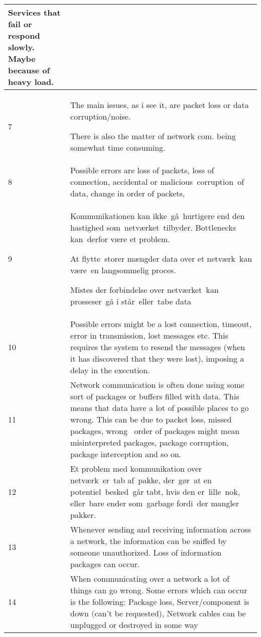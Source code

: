 \begin{longtable}{|p{0.3cm}|p{14.7cm}|}
\noindent Services that fail or respond slowly. Maybe because of heavy load. \\ \hline 

7 & The main issues, as i see it, are packet loss or data corruption/noise.

\noindent There is also the matter of network com. being somewhat time consuming. \\ \hline 

8 & Possible errors are loss of packets, loss of connection, accidental or malicious corruption of data, change in order of packets, \\ \hline 

9 & Kommunikationen kan ikke gå hurtigere end den hastighed som netværket tilbyder. Bottlenecks kan derfor være et problem.

\noindent At flytte storer mængder data over et netværk kan være en langsommelig proces.

\noindent Mistes der forbindelse over netværket kan prosseser gå i står eller tabe data \\ \hline 

10 & Possible errors might be a lost connection, timeout, error in transmission, lost messages etc. This requires the system to resend the messages (when it has discovered that they were lost), imposing a delay in the execution. \\ \hline 

11 & Network communication is often done using some sort of packages or buffers filled with data. This means that data have a lot of possible places to go wrong. This can be due to packet loss, missed packages, wrong  order of packages might mean misinterpreted packages, package corruption, package interception and so on. \\ \hline 

12 & Et problem med kommunikation over netværk er tab af pakke, der gør at en potentiel besked går tabt, hvis den er lille nok, eller bare ender som garbage fordi der mangler pakker. \\ \hline 

13 & Whenever sending and receiving information across a network, the information can be sniffed by someone unauthorized. Loss of information packages can occur.  \\ \hline 

14 & When communicating over a network a lot of things can go wrong. Some errors which can occur is the following: Package loss, Server/component is down (can't be requested), Network cables can be unplugged or destroyed in some way \\ \hline 


\end{longtable}
